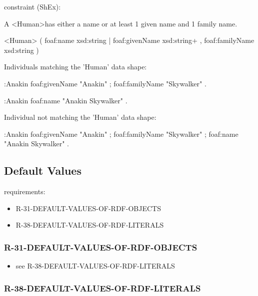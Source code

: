 \documentclass{llncs}
\begin{document}
constraint (ShEx):

A \textless Human\textgreater has either a name or at least 1 given name and 1 family name.

\begin{ex}
<Human> {                           
    (                                    
            foaf:name xsd:string              
        |                                   
            foaf:givenName xsd:string+ ,      
            foaf:familyName xsd:string
    )
}
\end{ex}

Individuals matching the 'Human' data shape:

\begin{ex}
:Anakin
    foaf:givenName "Anakin" ;
    foaf:familyName "Skywalker" .
\end{ex}

\begin{ex}
:Anakin
    foaf:name "Anakin Skywalker" .
\end{ex}

Individual not matching the 'Human' data shape:

\begin{ex}
:Anakin
    foaf:givenName "Anakin" ;
    foaf:familyName "Skywalker" ;
    foaf:name "Anakin Skywalker" .
\end{ex}

\subsection{Default Values}

requirements:

\begin{itemize}
	\item R-31-DEFAULT-VALUES-OF-RDF-OBJECTS
  \item R-38-DEFAULT-VALUES-OF-RDF-LITERALS
\end{itemize}

\subsubsection{R-31-DEFAULT-VALUES-OF-RDF-OBJECTS}

\begin{itemize}
	\item see R-38-DEFAULT-VALUES-OF-RDF-LITERALS
\end{itemize}

\subsubsection{R-38-DEFAULT-VALUES-OF-RDF-LITERALS}
\end{document}
